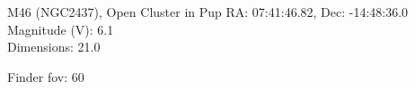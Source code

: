 \begin{block}{M46 (NGC2437), Open Cluster in Pup}
    RA: 07:41:46.82, Dec: -14:48:36.0 \\ 
    Magnitude (V): 6.1 \\ 
    Dimensions: 21.0 

    Finder fov: 60 
\end{block}